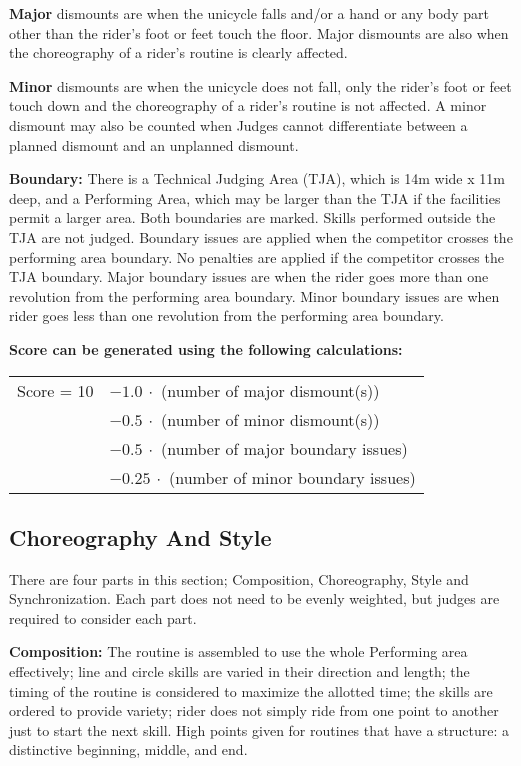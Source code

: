 \textbf{Major} dismounts are when the unicycle falls and/or a hand or any body part other than the rider's foot or feet touch the floor.
Major dismounts are also when the choreography of a rider's routine is clearly affected.

\textbf{Minor} dismounts are when the unicycle does not fall, only the rider's foot or feet touch down and the choreography of a rider's routine is not affected.
A minor dismount may also be counted when Judges cannot differentiate between a planned dismount and an unplanned dismount.

\textbf{Boundary:} There is a Technical Judging Area (TJA), which is 14m wide x 11m deep, and a Performing Area, which may be larger than the TJA if the facilities permit a larger area.
Both boundaries are marked.
Skills performed outside the TJA are not judged.
Boundary issues are applied when the competitor crosses the performing area boundary.
No penalties are applied if the competitor crosses the TJA boundary.
Major boundary issues are when the rider goes more than one revolution from the performing area boundary.
Minor boundary issues are when rider goes less than one revolution from the performing area boundary.

\textbf{Score can be generated using the following calculations:} \\ 
\begin{tabular}{r l}
Score = 10 & $- 1.0\ \cdot$ (number of major dismount(s)) \\
 & $- 0.5\ \cdot$ (number of minor dismount(s)) \\
 & $- 0.5\ \cdot$ (number of major boundary issues) \\
& $- 0.25\ \cdot$ (number of minor boundary issues) \\
\end{tabular}

\subsection{Choreography And Style \label{subsec:freestyle_individual-presentation-score_choreography-style}}
There are four parts in this section; Composition, Choreography, Style and Synchronization.
Each part does not need to be evenly weighted, but judges are required to consider each part.

\textbf{Composition:} The routine is assembled to use the whole Performing area effectively; line and circle skills are varied in their direction and length; the timing of the routine is considered to maximize the allotted time; the skills are ordered to provide variety; rider does not simply ride from one point to another just to start the next skill.
High points given for routines that have a structure: a distinctive beginning, middle, and end.

